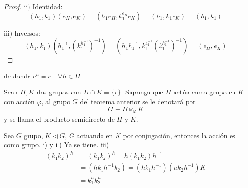 \begin{proof}
	ii) Identidad:
	\begin{equation*}
		(h_1, k_1)(e_H, e_K) = (h_1 e_H, k_1^{e_H} e_K) = (h_1, k_1 e_K) = (h_1, k_1)
	\end{equation*}


	iii) Inversos:
	\begin{equation*}
		(h_1, k_1)(h_1^{-1}, (k_1^{h_1^{-1}})^{-1}) = (h_1 h_1^{-1}, k_1^{h_1^{-1}} (k_1^{h_1^{-1}})^{-1}) = (e_H, e_K)
	\end{equation*}

\end{proof}


\begin{defi}
	de donde $e^h = e \quad \forall h \in H$.

	Sean $H, K$ dos grupos con $H \cap K = \{e\}$. Suponga que $H$ actúa como grupo en $K$ con acción $\varphi$, al grupo $G$ del teorema anterior se le denotará por
	\begin{equation*}
		G = H \ltimes_\varphi K
	\end{equation*}
	y se llama el producto semidirecto de $H$ y $K$.
\end{defi}

\begin{eje}
	Sea $G$ grupo, $K \triangleleft G$, $G$ actuando en $K$ por conjugación, entonces la acción es como grupo.
	i) y ii) Ya se tiene.
	iii)
	\begin{align*}
		(k_1 k_2)^h & = (k_1 k_2)^h = h(k_1 k_2)h^{-1}                     \\
		            & = (h k_1 h^{-1} k_2) = (h k_1 h^{-1})(h k_2 h^{-1})K \\
		            & = k_1^h k_2^h
	\end{align*}

\end{eje}

